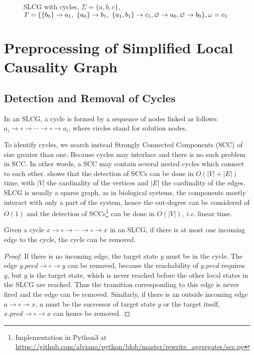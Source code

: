 \begin{figure}[ht]
    \centering
    
    \caption[Limitation of SLCG 2]{SLCG with cycles, $\Sigma=\{a,b,c\}$, $T=\{\acm{b_0}{a_0}{a_1},\ \acm{a_0}{b_0}{b_1},\ \acm{a_1,b_1}{c_0}{c_1},\varnothing \to a_0, \varnothing \to b_0\},\omega=c_1$}
    \label{fig:limitation2}
\end{figure}

\section{Preprocessing of Simplified Local Causality Graph}\label{sec:chap3preprocessing}
\subsection{Detection and Removal of Cycles}\label{sec:cycles}
\begin{definition}[Cycle]
In an SLCG, a cycle is formed by a sequence of nodes linked as follows: $a_i\to \circ \to \cdots \to \circ \to a_i$, where circles stand for solution nodes.
\end{definition}

To identify cycles, we search instead Strongly Connected Components (SCC) of size greater than one.
Because cycles may interlace and there is no such problem in SCC.
In other words, a SCC may contain several nested cycles which connect to each other.
\cite{tarjan1972} shows that the detection of SCCs can be done in $O (|V|+|E|)$ time, with $|V|$ the cardinality of the vertices and $|E|$ the cardinality of the edges.
SLCG is usually a sparse graph, as in biological systems, the components mostly interact with only a part of the system, hence the out-degree can be considered of $O (1)$ and the detection of SCCs\footnote{Implementation in Python3 at \url{https://github.com/alviano/python/blob/master/rewrite_aggregates/scc.py}} can be done in $O(|V|)$, \textit{i.e.} linear time.

\begin{theorem}\label{th:break_cycle}
Given a cycle $x\to \circ \to \cdots \to \circ \to x$ in an SLCG, if there is at most one incoming edge to the cycle, the cycle can be removed.
\end{theorem}

\begin{proof}
If there is no incoming edge, the target state $y$ must be in the cycle. 
The edge $y.pred\to\circ\to y$ can be removed, because the reachability of $y.pred$ requires $y$, but $y$ is the target state, which is never reached before the other local states in the SLCG are reached.
Thus the transition corresponding to this edge is never fired and the edge can be removed.
Similarly, if there is an outside incoming edge $a\to \circ \to x$, $a$ must be the successor of target state $y$ or the target itself, $x.pred\to\circ\to x$ can hence be removed.
\end{proof}


